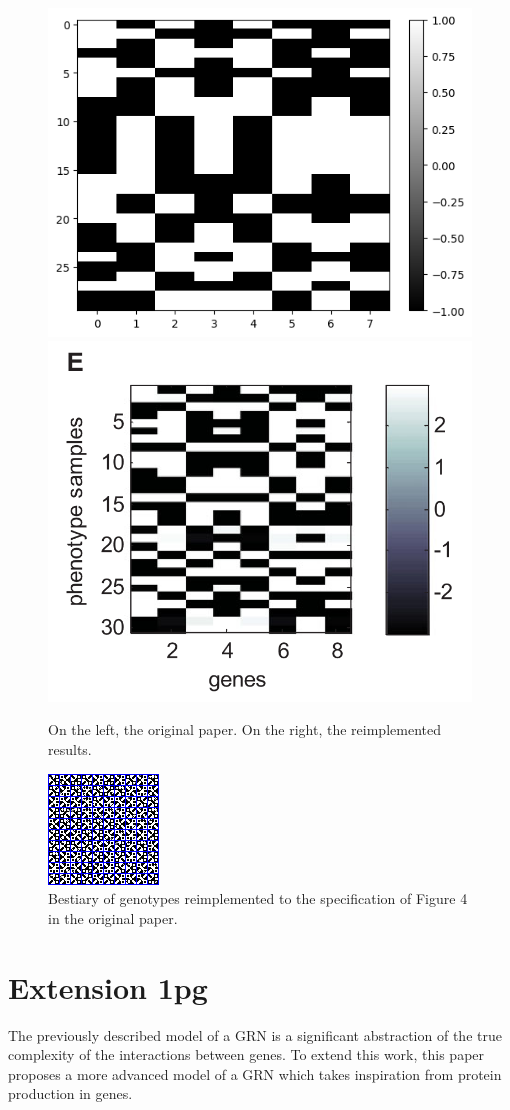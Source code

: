 \documentclass[twocolumn,a4paper]{article}
\begin{document}
    \begin{figure}[h]
        \centering
        \includegraphics[width=0.45\linewidth]{img/fig2e.png}
        \includegraphics[width=0.45\linewidth]{orig_img/fig2e.png}
        \caption{On the left, the original paper. On the right, the reimplemented results.} \label{fig:2e}
    \end{figure}

    \begin{figure}[h]
        \centering
        \includegraphics[width=0.45\linewidth]{img/fig4b.png}
        \caption{Bestiary of genotypes reimplemented to the specification of Figure 4 in the original paper.} \label{fig:4b}
    \end{figure}

    \section{Extension 1pg}
    The previously described model of a GRN is a significant abstraction of the true complexity of the interactions between genes. To extend this work, this paper proposes a more advanced model of a GRN which takes inspiration from protein production in genes.
\end{document}
